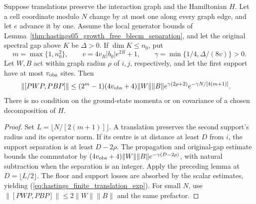 \begin{lemma}
    \label{thm:hastings_finite_translation_exp}
    \leanok
    Suppose translations preserve the interaction graph and the
    Hamiltonian $H$. Let a cell coordinate modulo $N$ change by at
    most one along every graph edge, and let $e$ advance it by one.
    Assume the local generator bounds of
    Lemma~\ref{thm:hastings05_growth_free_blecm_separation}, and let
    the original spectral gap above $K$ be $\Delta>0$.
    If $\dim K\le n_0$, put
    \[
        m=\max\{1,n_0^2\},\qquad
        v=4v_R|b_0|e^{2R}+1,\qquad
        \gamma=\min\{1/4,\Delta/(8v)\}>0.
    \]
    Let $W,B$ act within graph radius $\rho$ of $i,j$, respectively,
    and let the first support have at most $v_{\rm obs}$ sites. Then
    \begin{align}
        \|[PWP,PBP]\|
         & \le (2^m-1)(4v_{\rm obs}+4)\|W\|\|B\|
        e^{\gamma(2\rho+2)}e^{-\gamma N/[4(m+1)]}.
        \label{eq:hastings_finite_translation_exp}
    \end{align}
    There is no condition on the ground-state momenta or on covariance
    of a chosen decomposition of $H$.
\end{lemma}
\begin{proof}\leanok
    Set $L=\lfloor N/[2(m+1)]\rfloor$. A translation preserves the
    second support's radius and its operator norm. If its centre is
    at distance at least $D$ from $i$, the support separation is at
    least $D-2\rho$. The propagation and original-gap estimate bounds
    the commutator by
    $(4v_{\rm obs}+4)\|W\|\|B\|e^{-\gamma(D-2\rho)}$, with natural
    subtraction when the separation is an integer. Apply the
    preceding lemma at $D=\lfloor L/2\rfloor$. The floor and support
    losses are absorbed by the scalar estimates, yielding
    (\ref{eq:hastings_finite_translation_exp}). For small $N$, use
    $\|[PWP,PBP]\|\le2\|W\|\|B\|$ and the same prefactor.
\end{proof}

